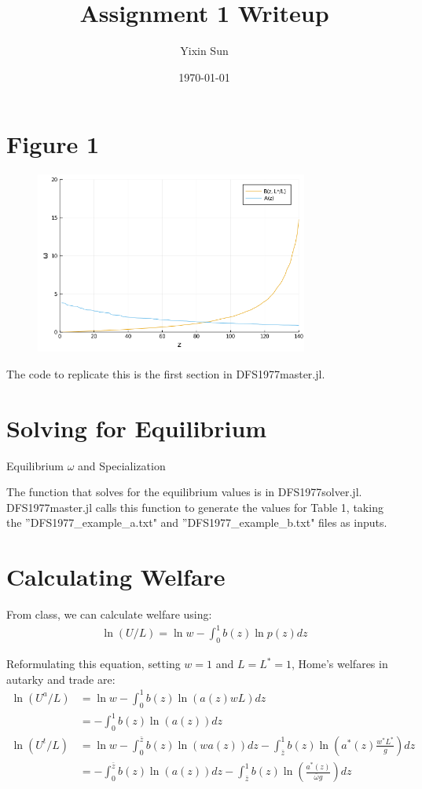 \documentclass[11pt]{article}
\title{\vspace{-1.5cm}Assignment 1 Writeup}
\author{Yixin Sun}
\date{\today}
\begin{document}
\maketitle

\section{Figure 1}
\begin{figure}[h]
    \centering
    \includegraphics[width=0.8\textwidth]{fig1.png}
\end{figure}

The code to replicate this is the first section in DFS1977master.jl. 

\section{Solving for Equilibrium}
\begin{table}[H]
    \centering
    \caption{Equilibrium $\omega$ and Specialization}
    
\end{table}

The function that solves for the equilibrium values is in DFS1977solver.jl. DFS1977master.jl calls this function to generate the values for Table 1, taking the ''DFS1977\_example\_a.txt" and ''DFS1977\_example\_b.txt" files as inputs. 

\section{Calculating Welfare}
From class, we can calculate welfare using:
\begin{align*}
    \ln (U / L)=\ln w-\int_{0}^{1} b(z) \ln p(z) d z
\end{align*}

Reformulating this equation, setting $w = 1$ and $L = L^* = 1$, Home's welfares in autarky and trade are:
\begin{align*}
    \ln (U^a / L) &=\ln w-\int_{0}^{1} b(z) \ln (a(z) w L) d z \\
    &= -\int_{0}^{1} b(z) \ln (a(z)) d z \\
    \ln (U^t / L) &= \ln w-\int_{0}^{\bar{z}} b(z) \ln (w a(z) ) d z-\int_{\bar{z}}^{1} b(z) \ln \left(a^{*}(z) \frac{w^{*} L^{*}}{g}\right) d z \\
    &= -\int_{0}^{\bar{z}} b(z) \ln (a(z)) d z-\int_{\bar{z}}^{1} b(z) \ln \left(\frac{a^{*}(z) }{\bar{\omega}g}\right) d z
\end{align*}
\end{document}

